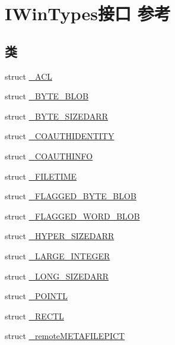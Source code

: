 \hypertarget{interface_i_win_types}{}\section{I\+Win\+Types接口 参考}
\label{interface_i_win_types}
\subsection*{类}
\begin{DoxyCompactItemize}
\item 
struct \hyperlink{struct_i_win_types_1_1___a_c_l}{\+\_\+\+A\+CL}
\item 
struct \hyperlink{struct_i_win_types_1_1___b_y_t_e___b_l_o_b}{\+\_\+\+B\+Y\+T\+E\+\_\+\+B\+L\+OB}
\item 
struct \hyperlink{struct_i_win_types_1_1___b_y_t_e___s_i_z_e_d_a_r_r}{\+\_\+\+B\+Y\+T\+E\+\_\+\+S\+I\+Z\+E\+D\+A\+RR}
\item 
struct \hyperlink{struct_i_win_types_1_1___c_o_a_u_t_h_i_d_e_n_t_i_t_y}{\+\_\+\+C\+O\+A\+U\+T\+H\+I\+D\+E\+N\+T\+I\+TY}
\item 
struct \hyperlink{struct_i_win_types_1_1___c_o_a_u_t_h_i_n_f_o}{\+\_\+\+C\+O\+A\+U\+T\+H\+I\+N\+FO}
\item 
struct \hyperlink{struct_i_win_types_1_1___f_i_l_e_t_i_m_e}{\+\_\+\+F\+I\+L\+E\+T\+I\+ME}
\item 
struct \hyperlink{struct_i_win_types_1_1___f_l_a_g_g_e_d___b_y_t_e___b_l_o_b}{\+\_\+\+F\+L\+A\+G\+G\+E\+D\+\_\+\+B\+Y\+T\+E\+\_\+\+B\+L\+OB}
\item 
struct \hyperlink{struct_i_win_types_1_1___f_l_a_g_g_e_d___w_o_r_d___b_l_o_b}{\+\_\+\+F\+L\+A\+G\+G\+E\+D\+\_\+\+W\+O\+R\+D\+\_\+\+B\+L\+OB}
\item 
struct \hyperlink{struct_i_win_types_1_1___h_y_p_e_r___s_i_z_e_d_a_r_r}{\+\_\+\+H\+Y\+P\+E\+R\+\_\+\+S\+I\+Z\+E\+D\+A\+RR}
\item 
struct \hyperlink{struct_i_win_types_1_1___l_a_r_g_e___i_n_t_e_g_e_r}{\+\_\+\+L\+A\+R\+G\+E\+\_\+\+I\+N\+T\+E\+G\+ER}
\item 
struct \hyperlink{struct_i_win_types_1_1___l_o_n_g___s_i_z_e_d_a_r_r}{\+\_\+\+L\+O\+N\+G\+\_\+\+S\+I\+Z\+E\+D\+A\+RR}
\item 
struct \hyperlink{struct_i_win_types_1_1___p_o_i_n_t_l}{\+\_\+\+P\+O\+I\+N\+TL}
\item 
struct \hyperlink{struct_i_win_types_1_1___r_e_c_t_l}{\+\_\+\+R\+E\+C\+TL}
\item 
struct \hyperlink{struct_i_win_types_1_1__remote_m_e_t_a_f_i_l_e_p_i_c_t}{\+\_\+remote\+M\+E\+T\+A\+F\+I\+L\+E\+P\+I\+CT}

\end{DoxyCompactItemize}
